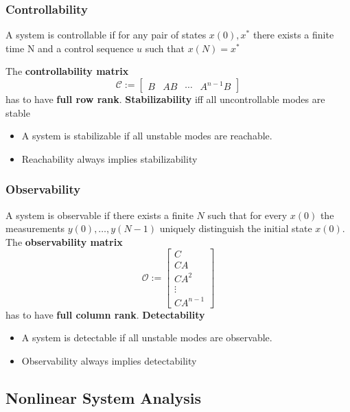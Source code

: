 \subsubsection{Controllability}

A system is controllable if for any pair of states $x(0), x^*$ there exists a finite time N and a control sequence $u$ such that $x(N)=x^*$

\newpar{}
The \textbf{controllability matrix}
\begin{equation*}
    \mathcal{C} :=
    \begin{bmatrix}
        B & AB & \cdots & A^{n-1} B
    \end{bmatrix}
\end{equation*}
has to have \textbf{full row rank}.
\newpar{}
\textbf{Stabilizability} iff all uncontrollable modes are stable
\begin{itemize}
    \item A system is stabilizable if all unstable modes are reachable.
    \item Reachability always implies stabilizability
\end{itemize}

\subsubsection{Observability}


A system is observable if there exists a finite $N$ such that for every $x(0)$ the measurements $y(0), \ldots, y(N-1)$ uniquely distinguish the initial state $x(0)$.
\newpar{}
The \textbf{observability matrix}
\begin{equation*}
    \mathcal{O} :=
    \begin{bmatrix}
        C      \\
        CA     \\
        CA^2   \\
        \vdots \\
        CA^{n-1}
    \end{bmatrix}
\end{equation*}
has to have \textbf{full column rank}.
\newpar{}
\textbf{Detectability}
\begin{itemize}
    \item A system is detectable if all unstable modes are observable.
    \item Observability always implies detectability
\end{itemize}


\subsection{Nonlinear System Analysis}

